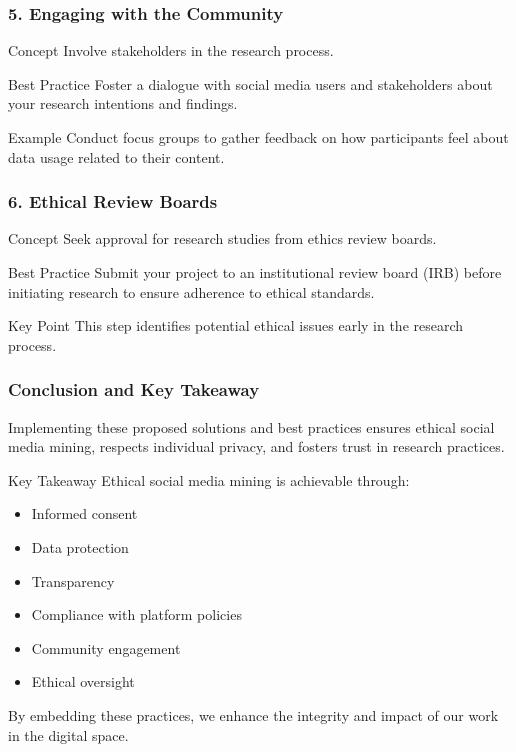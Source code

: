 \documentclass{beamer}
\begin{document}
\begin{frame}[fragile]
    \frametitle{5. Engaging with the Community}

    \begin{block}{Concept}
        Involve stakeholders in the research process.
    \end{block}

    \begin{block}{Best Practice}
        Foster a dialogue with social media users and stakeholders about your research intentions and findings.
    \end{block}
    
    \begin{block}{Example}
        Conduct focus groups to gather feedback on how participants feel about data usage related to their content.
    \end{block}
\end{frame}

\begin{frame}[fragile]
    \frametitle{6. Ethical Review Boards}

    \begin{block}{Concept}
        Seek approval for research studies from ethics review boards.
    \end{block}

    \begin{block}{Best Practice}
        Submit your project to an institutional review board (IRB) before initiating research to ensure adherence to ethical standards.
    \end{block}

    \begin{block}{Key Point}
        This step identifies potential ethical issues early in the research process.
    \end{block}

\end{frame}

\begin{frame}[fragile]
    \frametitle{Conclusion and Key Takeaway}

    Implementing these proposed solutions and best practices ensures ethical social media mining, respects individual privacy, and fosters trust in research practices.

    \begin{block}{Key Takeaway}
        Ethical social media mining is achievable through:
        \begin{itemize}
            \item Informed consent
            \item Data protection
            \item Transparency
            \item Compliance with platform policies
            \item Community engagement
            \item Ethical oversight
        \end{itemize}
        By embedding these practices, we enhance the integrity and impact of our work in the digital space.
    \end{block}
\end{frame}
\end{document}
